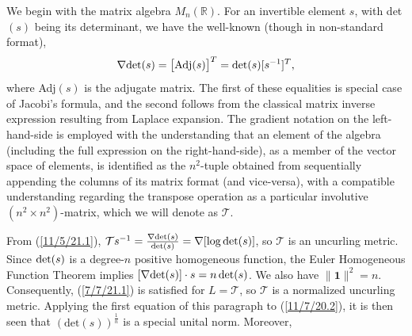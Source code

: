 \documentclass{amsart}
\numberwithin{equation}{section}
\theoremstyle{definition}
\numberwithin{theorem}{section}
\begin{document}
 We begin with the matrix algebra $ M_n(\mathbb{R})$. For an invertible element $s$, with det$(s)$ being its determinant, we have the well-known (though in non-standard format),
  \begin{equation}\label{11/5/21.1} \nabla \mbox{det}(s) = \big[{\rm Adj}(s)\big]^T = \mbox{det}(s)[s^{-1}]^T,\end{equation} where Adj$(s)$ is the adjugate matrix.  The first of these equalities is special case of Jacobi's formula, and the second follows from the classical matrix inverse expression resulting from Laplace expansion.  The gradient notation on the left-hand-side is employed with the understanding that an element of the algebra (including the full expression on the right-hand-side), as a member of the vector space of elements, is identified as the $n^2$-tuple obtained from sequentially appending the columns of its matrix format (and vice-versa), with a compatible understanding regarding the transpose operation as a particular involutive $(n^2\times n^2)$-matrix, which we will denote as $\mathcal{T}$. 
  
From (\ref{11/5/21.1}), $\mathcal{T}s^{-1} = \frac{\nabla{\rm det}(s)}{{\rm det}(s)} = \nabla[\log{\rm det}(s)]$, so $\mathcal{T}$ is an uncurling metric.  Since ${\rm det}(s)$ is a degree-$n$ positive homogeneous function, the Euler Homogeneous Function Theorem implies $[\nabla{\rm det}(s)]\cdot s = n \,{\rm det}(s)$.  We also have $\|\mathbf{1}\|^2 = n$.  Consequently, (\ref{7/7/21.1}) is satisfied for $L=\mathcal{T}$, so $\mathcal{T}$ is a normalized uncurling metric.  Applying the first equation of this paragraph to (\ref{11/7/20.2}), it is then seen that $(\text{det}(s))^{\frac{1}{n}}$ is a special unital norm.
  Moreover,
 
\end{document}
